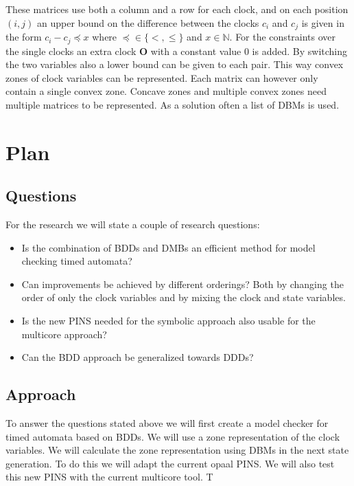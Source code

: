 \documentclass[11pt]{article}
\begin{document}
These matrices use both a column and a row for each clock, and on each position $(i,j)$ an upper bound on the difference between the clocks $c_i$ and $c_j$ is given in the form $c_i - c_j \preceq x$ where $\preceq \in \{<, \leq\}$ and $x \in \mathbb{N}$. For the constraints over the single clocks an extra clock $\mathbf{O}$ with a constant value 0 is added. By switching the two variables also a lower bound can be given to each pair. This way convex zones of clock variables can be represented. Each matrix can however only contain a single convex zone. Concave zones and multiple convex zones need multiple matrices to be represented. As a solution often a list of DBMs is used. 

\section{Plan}

\subsection{Questions}
For the research we will state a couple of research questions:
{\renewcommand\labelitemi{--}
	\begin{itemize}
		\item Is the combination of BDDs and DMBs an efficient method for model checking timed automata?
		\item Can improvements be achieved by different orderings? Both by changing the order of only the clock variables and by mixing the clock and state variables.
		\item Is the new PINS needed for the symbolic approach also usable for the multicore approach?
		\item Can the BDD approach be generalized towards DDDs?
	\end{itemize}
}

\subsection{Approach}
To answer the questions stated above we will first create a model checker for timed automata based on BDDs. We will use a zone representation of the clock variables. We will calculate the zone representation using DBMs in the next state generation. To do this we will adapt the current opaal PINS. We will also test this new PINS with the current multicore tool. T

\end{document}

